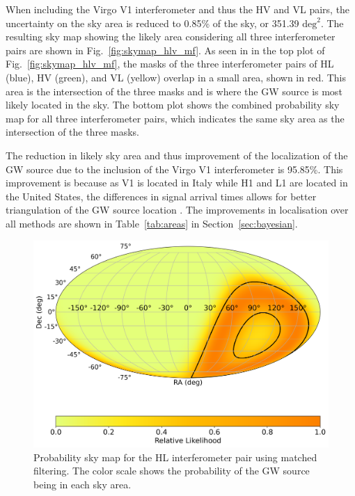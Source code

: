 \documentclass[11pt,a4paper]{article}
\begin{document}
When including the Virgo V1 interferometer and thus the HV and VL pairs, the uncertainty on the sky area is reduced to 0.85\% of the sky, or 351.39 $\mathrm{deg}^2$. The resulting sky map showing the likely area considering all three interferometer pairs are shown in Fig.~\ref{fig:skymap_hlv_mf}. As seen in in the top plot of Fig.~\ref{fig:skymap_hlv_mf}, the masks of the three interferometer pairs of HL (blue), HV (green), and VL (yellow) overlap in a small area, shown in red. This area is the intersection of the three masks and is where the GW source is most likely located in the sky. The bottom plot shows the combined probability sky map for all three interferometer pairs, which indicates the same sky area as the intersection of the three masks.

The reduction in likely sky area and thus improvement of the localization of the GW source due to the inclusion of the Virgo V1 interferometer is 95.85\%. This improvement is because as V1 is located in Italy while H1 and L1 are located in the United States, the differences in signal arrival times allows for better triangulation of the GW source location \citep{LIGO2015, Acernese_2014}. The improvements in localisation over all methods are shown in Table~\ref{tab:areas} in Section~\ref{sec:bayesian}.

\begin{figure}
    \includegraphics[width=\columnwidth, keepaspectratio]{../figures/detector_skymap_HL.png}
    \caption{Probability sky map for the HL interferometer pair using matched filtering. The color scale shows the probability of the GW source being in each sky area.}
    \label{fig:skymap_hl_mf}
\end{figure}
\end{document}
